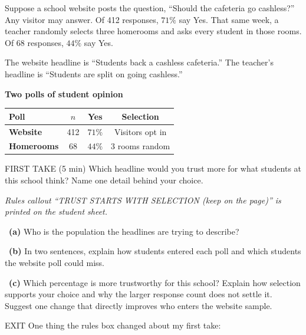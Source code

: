 \documentclass[11pt]{article}
\begin{document}
Suppose a school website posts the question, ``Should the cafeteria go cashless?'' Any visitor may answer. Of 412 responses, $71\%$ say Yes. That same week, a teacher randomly selects three homerooms and asks every student in those rooms. Of 68 responses, $44\%$ say Yes.\par\smallskip The website headline is ``Students back a cashless cafeteria.'' The teacher's headline is ``Students are split on going cashless.''\par
\begin{center}
\textbf{Two polls of student opinion}\par\smallskip
\begin{tabular}{|l|c|c|c|}
\hline
\textbf{Poll} & \textbf{$n$} & \textbf{Yes} & \textbf{Selection} \\ \hline
\textbf{Website} & 412 & $71\%$ & Visitors opt in \\ \hline
\textbf{Homerooms} & 68 & $44\%$ & 3 rooms random \\ \hline
\end{tabular}
\end{center}
\begin{firsttakebox}{FIRST TAKE (5 min)}
Which headline would you trust more for what students at this school think? Name one detail behind your choice.\par
{}
\end{firsttakebox}

\textit{Rules callout ``TRUST STARTS WITH SELECTION (keep on the page)'' is printed on the student sheet.}\par\medskip

~\textbf{(a)} Who is the population the headlines are trying to describe?\par
{}

~\textbf{(b)} In two sentences, explain how students entered each poll and which students the website poll could miss.\par
{}

~\textbf{(c)} Which percentage is more trustworthy for this school? Explain how selection supports your choice and why the larger response count does not settle it. Suggest one change that directly improves who enters the website sample.\par
{}

\begin{summaryexitbox}{EXIT}
One thing the rules box changed about my first take: \hrulefill
\end{summaryexitbox}
\end{document}
